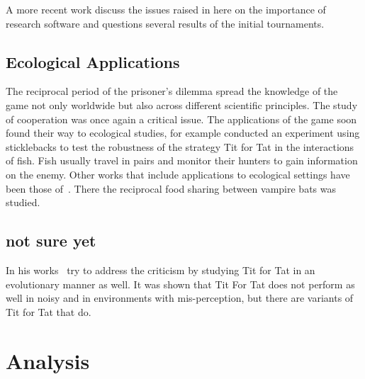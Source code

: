 \documentclass{article}
\begin{document}
A more recent work discuss the issues raised in here on the importance 
of research software and questions several results of the initial tournaments.%

\subsection{Ecological Applications}

The reciprocal period of the prisoner's dilemma spread the knowledge of the
game not only worldwide but also across different scientific principles. The
study of cooperation was once again a critical issue. The applications of
the game soon found their way to ecological studies, for example 
\cite{Milinski1987} conducted an experiment using sticklebacks to test
the robustness of the strategy Tit for Tat in the interactions of fish. Fish usually
travel in pairs and monitor their hunters to gain information on the enemy.
Other works that include applications to ecological settings have been those
of~\cite{Godfray1992, Wilkinson1984}. There the reciprocal food sharing
between vampire bats was studied.

\subsection{not sure yet}
In his works~\cite{axelrod1988} try to address the criticism by studying Tit for 
Tat in an evolutionary manner as well. It was shown that Tit For Tat does not 
perform as well in noisy and in environments with mis-perception, but there are 
variants of Tit for Tat that do.




\section{Analysis}\label{section:analysis}



\end{document}
